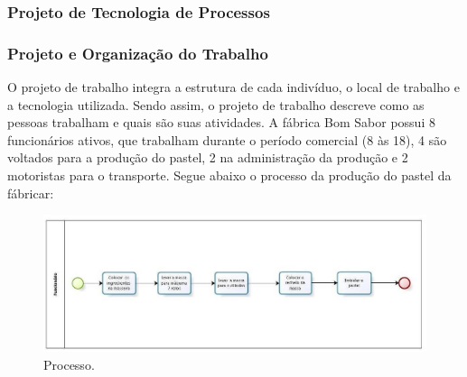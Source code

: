 \subsubsection{Projeto de Tecnologia de Processos}

\subsubsection{Projeto e Organização do Trabalho}

O projeto de trabalho integra a estrutura de cada indivíduo, o local de trabalho e a tecnologia utilizada. Sendo assim, o projeto de trabalho descreve como as pessoas trabalham e quais são suas atividades. A fábrica Bom Sabor possui 8 funcionários ativos, que trabalham durante o período comercial (8 às 18), 4 são voltados para a produção do pastel, 2 na administração da produção e 2 motoristas para o transporte. Segue abaixo o processo da produção do pastel da fábricar:

\begin{figure}[H]
    \centering
  \includegraphics[keepaspectratio=true,scale=0.5]{figuras/processo.eps}
    \caption{Processo.}
    \label{fig:processo}
\end{figure}

